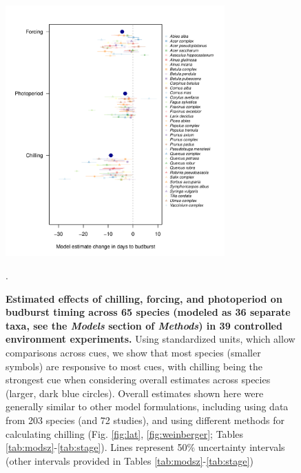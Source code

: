 \documentclass{article}
\begin{document}
\begin{figure}[h!]
\centering
\noindent \includegraphics[width=0.75\textwidth]{..//..//analyses/bb_analysis/figures/muplotspcompexprampfputah_z.pdf}
\caption{\textbf{Estimated effects of chilling, forcing, and photoperiod on budburst timing across 65 species (modeled as 36 separate taxa, see the \emph{Models} section of \emph{Methods}) in 39 controlled environment experiments.} Using standardized units, which allow comparisons across cues, we show that most species (smaller symbols) are responsive to most cues, with chilling being the strongest cue when considering overall estimates across species (larger, dark blue circles). Overall estimates shown here were generally similar to other model formulations, including using data from 203 species (and 72 studies), and using different methods for calculating chilling (Fig. \ref{fig:lat}, \ref{fig:weinberger}; Tables \ref{tab:modsz}-\ref{tab:stage}). Lines represent 50\% uncertainty intervals (other intervals provided in Tables \ref{tab:modsz}-\ref{tab:stage})}.  
\label{fig:mu}
\end{figure}

\newpage
\end{document}
